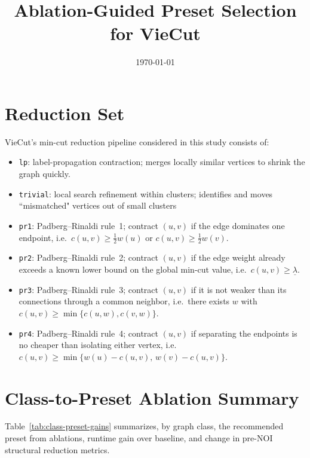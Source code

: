\documentclass[11pt]{article}
\title{Ablation-Guided Preset Selection for VieCut}
\author{}
\date{\today}
\begin{document}
\maketitle

\section{Reduction Set}
VieCut's min-cut reduction pipeline considered in this study consists of:
\begin{itemize}[leftmargin=*]
	\item \texttt{lp}: label-propagation contraction; merges locally similar vertices to shrink the graph quickly.
	
	\item \texttt{trivial}: local search refinement within clusters; identifies and moves ``mismatched" vertices out of small clusters
	
	\item \texttt{pr1}: Padberg--Rinaldi rule~1; contract $(u,v)$ if the edge dominates one endpoint, i.e.\ 
	$c(u,v) \ge \tfrac{1}{2} w(u)$ or $c(u,v) \ge \tfrac{1}{2} w(v)$.
	
	\item \texttt{pr2}: Padberg--Rinaldi rule~2; contract $(u,v)$ if the edge weight already exceeds a known lower bound on the global min-cut value, i.e.\ 
	$c(u,v) \ge \underline{\lambda}$.
	
	\item \texttt{pr3}: Padberg--Rinaldi rule~3; contract $(u,v)$ if it is not weaker than its connections through a common neighbor, i.e.\ 
	there exists $w$ with $c(u,v) \ge \min\{c(u,w),c(v,w)\}$.
	
	\item \texttt{pr4}: Padberg--Rinaldi rule~4; contract $(u,v)$ if separating the endpoints is no cheaper than isolating either vertex, i.e.\ 
	$c(u,v) \ge \min\{w(u)-c(u,v),\, w(v)-c(u,v)\}$.
\end{itemize}

\section{Class-to-Preset Ablation Summary}
Table~\ref{tab:class-preset-gains} summarizes, by graph class, the recommended preset from ablations, runtime gain over baseline, and change in pre-NOI structural reduction metrics.
\end{document}
